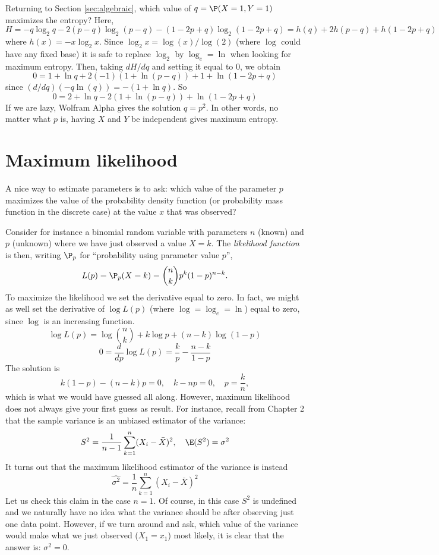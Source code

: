 Returning to Section \ref{sec:algebraic}, which value of $q=\P(X=1,Y=1)$ maximizes the entropy?
Here,
\[
	H = -q\log_2 q - 2(p-q)\log_2 (p-q) - (1-2p+q)\log_2(1-2p+q) = h(q)+2h(p-q)+h(1-2p+q)
\]
where $h(x)=-x\log_2 x$.
Since $\log_2 x = \log(x)/\log(2)$ (where $\log$ could have any fixed base) it is safe to replace $\log_2$ by $\log_e=\ln$ when looking for maximum entropy.
Then, taking $dH/dq$ and setting it equal to 0, we obtain
\[
	0 = 1+\ln q + 2(-1)(1+\ln(p-q)) + 1+\ln(1-2p+q)
\]
since $(d/dq)(-q\ln(q)) = -(1+\ln q)$. So
\[
	0 = 2+\ln q - 2(1+\ln(p-q)) + \ln(1-2p+q)
\]
If we are lazy, Wolfram Alpha gives the solution $q=p^2$. In other words, no matter what $p$ is, having $X$ and $Y$ be independent gives maximum entropy.
\section{Maximum likelihood}

	A nice way to estimate parameters is to ask: which value of the parameter $p$ maximizes the value of the probability density function (or probability mass function in the discrete case) at the value $x$ that was observed?

	Consider for instance a binomial random variable with parameters $n$ (known) and $p$ (unknown) where we have just observed a value $X=k$. The \emph{likelihood function} is then, writing $\P_p$ for ``probability using parameter value $p$'',
	\[
		L(p) = \P_p(X=k) = \binom{n}{k} p^k (1-p)^{n-k}.
	\]
	To maximize the likelihood we set the derivative equal to zero. In fact, we might as well set the derivative of $\log L(p)$ (where $\log=\log_e=\ln$) equal to zero, since $\log$ is an increasing function.
	\[
		\log L(p) = \log\binom{n}{k} + k\log p + (n-k)\log (1-p)
	\]
	\[
		0 = \frac{d}{dp} \log L(p) = \frac{k}p - \frac{n-k}{1-p}
	\]
	The solution is
	\[
		k(1-p) - (n-k)p = 0,\quad k-np=0,\quad p = \frac{k}n,
	\]
	which is what we would have guessed all along.
	However, maximum likelihood does not always give your first guess as result.
	For instance, recall from Chapter 2 that the sample variance is an unbiased estimator of the variance:
	\[
		S^2 = \frac1{n-1}\sum_{k=1}^n (X_i-\bar X)^2,\quad \E(S^2)=\sigma^2
	\]
	It turns out that the maximum likelihood estimator of the variance is instead
	\[
		\widehat{\sigma^2} = \frac1{n}\sum_{k=1}^n (X_i-\bar X)^2
	\]
	Let us check this claim in the case $n=1$. Of course, in this case $S^2$ is undefined and we naturally have no idea what the variance should be after observing just one data point. However, if we turn around and ask, which value of the variance would make what we just observed ($X_1=x_1$) most likely, it is clear that the answer is: $\sigma^2=0$.
